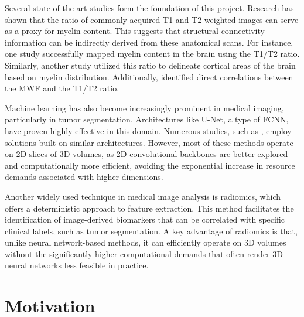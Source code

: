 Several state-of-the-art studies form the foundation of this project. Research has shown that the ratio of commonly acquired T1 and T2 weighted images can serve as a proxy for myelin content. This suggests that structural connectivity information can be indirectly derived from these anatomical scans. For instance, one study \cite{myelin2} successfully mapped myelin content in the brain using the T1/T2 ratio. Similarly, another study \cite{myelin} utilized this ratio to delineate cortical areas of the brain based on myelin distribution. Additionally, \cite{myelin3} identified direct correlations between the \ac{MWF} and the T1/T2 ratio.\par
Machine learning has also become increasingly prominent in medical imaging, particularly in tumor segmentation. Architectures like U-Net, a type of \ac{FCNN}, have proven highly effective in this domain. Numerous studies, such as \cite{unetseg}, employ solutions built on similar architectures. However, most of these methods operate on 2D slices of 3D volumes, as 2D convolutional backbones are better explored and computationally more efficient, avoiding the exponential increase in resource demands associated with higher dimensions.\par
Another widely used technique in medical image analysis is radiomics, which offers a deterministic approach to feature extraction. This method facilitates the identification of image-derived biomarkers that can be correlated with specific clinical labels, such as tumor segmentation. \cite{radioseg} A key advantage of radiomics is that, unlike neural network-based methods, it can efficiently operate on 3D volumes without the significantly higher computational demands that often render 3D neural networks less feasible in practice.

\section{Motivation}


